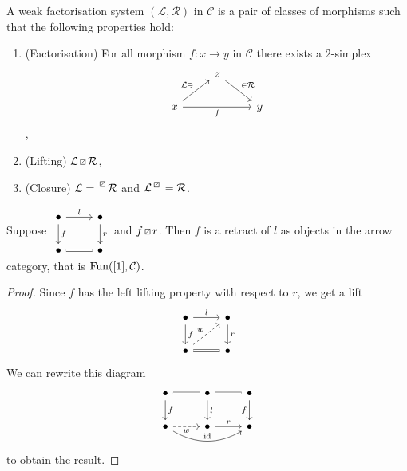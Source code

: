 \begin{defi}
\label{weak factorisation system}
    A weak factorisation system $(\mathcal{L},\mathcal{R})$ in $\mathcal{C}$ is a pair of classes of morphisms such that the following properties hold:
    \begin{enumerate}
        \item 
        (Factorisation) For all morphism $f:x\to y$ in $\mathcal{C}$ there exists a $2$-simplex
        \[
        \begin{tikzcd}
            &
            z
            \ar[rd,"\in \mathcal{R}"]
            \\
            x
            \ar[ru, " \mathcal{L} \ni"]
            \ar[rr, "f"']
            &&
            y
        \end{tikzcd}
        \],
        \item 
        (Lifting) $\mathcal{L} \lift{} \mathcal{R}$,
        \item 
        (Closure) $\mathcal{L} = \prescript{\lift{}}{}{\mathcal{R}}$ and $\mathcal{L}^{\lift{}} = \mathcal{R}$.
    \end{enumerate}
\end{defi}

\begin{lem}
\label{The retract argument}
Suppose 
$
\begin{tikzcd}
    \bullet
    \ar[d, "f"]
    \ar[r, "l"]
    &
    \bullet
    \ar[d, "r"]
    \\
    \bullet 
    \ar[r, equal]
    &
    \bullet
\end{tikzcd}
$
and $f \lift{} r$. Then $f$ is a retract of $l$ as objects in the arrow category, that is $\operatorname{Fun}([1], \mathcal{C})$.
\end{lem}

\begin{proof}
Since $f$ has the left lifting property with respect to $r$, we get a lift
\[
    \begin{tikzcd}
        \bullet
        \ar[d, "f"]
        \ar[r, "l"]
        &
        \bullet
        \ar[d, "r"]
        \\
        \bullet 
        \ar[ru, dashed, "w"]
        \ar[r, equal]
        &
        \bullet
    \end{tikzcd}
\]
We can rewrite this diagram
\[
    \begin{tikzcd}
        \bullet 
        \ar[r, equal]
        \ar[d, "f"]
        &
        \bullet
        \ar[r, equal]
        \ar[d, "l"]
        &
        \bullet
        \ar[d, "f"']
        \\
        \bullet
        \ar[rr, bend right, "\id"]
        \ar[r, dashed, "w"']
        &
        \bullet
        \ar[r, "r"]
        &
        \bullet
    \end{tikzcd}
\]
to obtain the result.
\end{proof}

